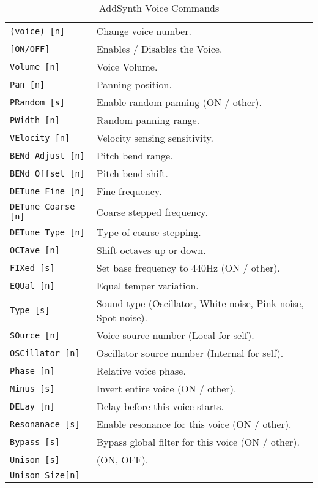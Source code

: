   \begin{table}[H]
      \caption{AddSynth Voice Commands}
      \label{table:yoshimi_part_addsynth_voice_commands}
      \begin{tabular}{l l}
\texttt{(voice) [n]} &
   Change voice number.  \\
\texttt{[ON/OFF]} &
   Enables / Disables the Voice. \\
\texttt{Volume [n]} &
   Voice Volume.  \\
\texttt{Pan [n]} &
   Panning position.\\
\texttt{PRandom [s]} &
   Enable random panning (ON / other).\\
\texttt{PWidth [n]} &
   Random panning range.\\
\texttt{VElocity [n]} &
   Velocity sensing sensitivity. \\
\texttt{BENd Adjust [n]} &
   Pitch bend range. \\
\texttt{BENd Offset [n]} &
   Pitch bend shift. \\
\texttt{DETune Fine [n]} &
   Fine frequency.   \\
\texttt{DETune Coarse [n]} &
   Coarse stepped frequency.  \\
\texttt{DETune Type [n]} &
   Type of coarse stepping.   \\
\texttt{OCTave [n]} &
   Shift octaves up or down.  \\
\texttt{FIXed [s]} &
   Set base frequency to 440Hz (ON / other).  \\
\texttt{EQUal [n]} &
   Equal temper variation. \\
\texttt{Type [s]} &
   Sound type (Oscillator, White noise, Pink noise, Spot noise). \\
\texttt{SOurce [n]} &
   Voice source number (Local for self). \\
\texttt{OSCillator [n]} &
   Oscillator source number (Internal for self). \\
\texttt{Phase [n]} &
   Relative voice phase. \\
\texttt{Minus [s]} &
   Invert entire voice (ON / other). \\
\texttt{DELay [n]} &
   Delay before this voice starts. \\
\texttt{Resonanace [s]} &
   Enable resonance for this voice (ON / other). \\
\texttt{Bypass [s]} &
   Bypass global filter for this voice (ON / other). \\
\texttt{Unison [s]} &
   (ON, OFF). \\
\texttt{Unison Size[n]} &

\end{tabular}
\end{table}
